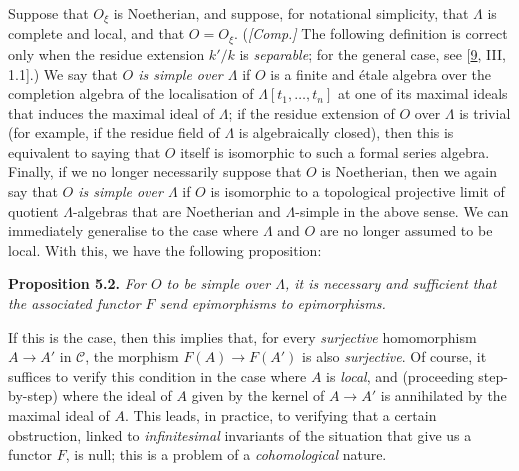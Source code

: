\documentclass{article}
\newenvironment{itenv}[1]
  {\phantomsection\par\smallskip\noindent\textbf{#1.}\itshape}
  {\par\smallskip}
\theoremstyle{definition}
\theoremstyle{definition}
\theoremstyle{definition}
\theoremstyle{definition}
\theoremstyle{remark}
\begin{document}
Suppose that \(O_\xi\) is Noetherian, and suppose, for notational simplicity, that \(\Lambda\) is complete and local, and that \(O=O_\xi\).
(\emph{{[}Comp.{]}} The following definition is correct only when the residue extension \(k'/k\) is \emph{separable}; for the general case, see {[}\protect\hyperlink{ref-Gro1960b}{9}, III, 1.1{]}.)
We say that \emph{\(O\) is simple over \(\Lambda\)} if \(O\) is a finite and étale algebra over the completion algebra of the localisation of \(\Lambda[t_1,\ldots,t_n]\) at one of its maximal ideals that induces the maximal ideal of \(\Lambda\);
if the residue extension of \(O\) over \(\Lambda\) is trivial (for example, if the residue field of \(\Lambda\) is algebraically closed), then this is equivalent to saying that \(O\) itself is isomorphic to such a formal series algebra.
Finally, if we no longer necessarily suppose that \(O\) is Noetherian, then we again say that \emph{\(O\) is simple over \(\Lambda\)} if \(O\) is isomorphic to a topological projective limit of quotient \(\Lambda\)-algebras that are Noetherian and \(\Lambda\)-simple in the above sense.
We can immediately generalise to the case where \(\Lambda\) and \(O\) are no longer assumed to be local.
With this, we have the following proposition:

\leavevmode{}%
\begin{itenv}{Proposition 5.2}
For \(O\) to be simple over \(\Lambda\), it is necessary and sufficient that the associated functor \(F\) send epimorphisms to epimorphisms.

\end{itenv}

If this is the case, then this implies that, for every \emph{surjective} homomorphism \(A\to A'\) in \({\mathcal{C}}\), the morphism \(F(A)\to F(A')\) is also \emph{surjective}.
Of course, it suffices to verify this condition in the case where \(A\) is \emph{local}, and (proceeding step-by-step) where the ideal of \(A\) given by the kernel of \(A\to A'\) is annihilated by the maximal ideal of \(A\).
This leads, in practice, to verifying that a certain obstruction, linked to \emph{infinitesimal} invariants of the situation that give us a functor \(F\), is null;
this is a problem of a \emph{cohomological} nature.
\end{document}
